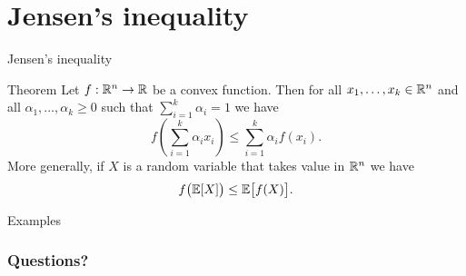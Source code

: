 \documentclass{beamer}
\begin{document}
\section{Jensen's inequality}


\begin{frame}[t]{Jensen's inequality}
	\grid

	\vspace{-0.4cm}

	\begin{block}{Theorem}
	Let $f: \mathbb{R}^n \to \mathbb{R}$ be a convex function. Then for all $x_1, \dots, x_k \in \mathbb{R}^n$ and all $\alpha_1, \dots, \alpha_k \geq 0$ such that $\sum_{i=1}^k \alpha_i = 1$ we have
	$$
	f\left(\sum_{i=1}^k \alpha_i x_i \right) \leq \sum_{i=1}^k \alpha_i f(x_i).
	$$
	More generally, if $X$ is a random variable that takes value in $\mathbb{R}^n$ we have
	$$
	f\big(\mathbb{E} [X]\big) \leq \mathbb{E} \big[f(X)\big].
	$$
	\end{block}

\end{frame}


\begin{frame}[t]{Examples}
	\grid

\end{frame}



\appendix
\backupbegin
\begin{frame}[t]
	\frametitle{Questions?}
	\grid

	\pause
\end{frame}
\backupend
\end{document}
